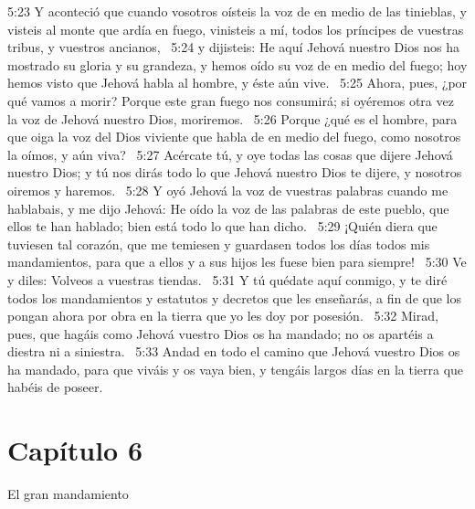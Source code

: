 5:23 Y aconteció que cuando vosotros oísteis la voz de en medio de las tinieblas, y visteis al monte que ardía en fuego, vinisteis a mí, todos los príncipes de vuestras tribus, y vuestros ancianos,  
5:24 y dijisteis: He aquí Jehová nuestro Dios nos ha mostrado su gloria y su grandeza, y hemos oído su voz de en medio del fuego; hoy hemos visto que Jehová habla al hombre, y éste aún vive.  
5:25 Ahora, pues, ¿por qué vamos a morir? Porque este gran fuego nos consumirá; si oyéremos otra vez la voz de Jehová nuestro Dios, moriremos.  
5:26 Porque ¿qué es el hombre, para que oiga la voz del Dios viviente que habla de en medio del fuego, como nosotros la oímos, y aún viva?  
5:27 Acércate tú, y oye todas las cosas que dijere Jehová nuestro Dios; y tú nos dirás todo lo que Jehová nuestro Dios te dijere, y nosotros oiremos y haremos.  
5:28 Y oyó Jehová la voz de vuestras palabras cuando me hablabais, y me dijo Jehová: He oído la voz de las palabras de este pueblo, que ellos te han hablado; bien está todo lo que han dicho.  
5:29 ¡Quién diera que tuviesen tal corazón, que me temiesen y guardasen todos los días todos mis mandamientos, para que a ellos y a sus hijos les fuese bien para siempre!  
5:30 Ve y diles: Volveos a vuestras tiendas.  
5:31 Y tú quédate aquí conmigo, y te diré todos los mandamientos y estatutos y decretos que les enseñarás, a fin de que los pongan ahora por obra en la tierra que yo les doy por posesión.  
5:32 Mirad, pues, que hagáis como Jehová vuestro Dios os ha mandado; no os apartéis a diestra ni a siniestra.  
5:33 Andad en todo el camino que Jehová vuestro Dios os ha mandado, para que viváis y os vaya bien, y tengáis largos días en la tierra que habéis de poseer.  
\section*{Capítulo 6 }
El gran mandamiento  

